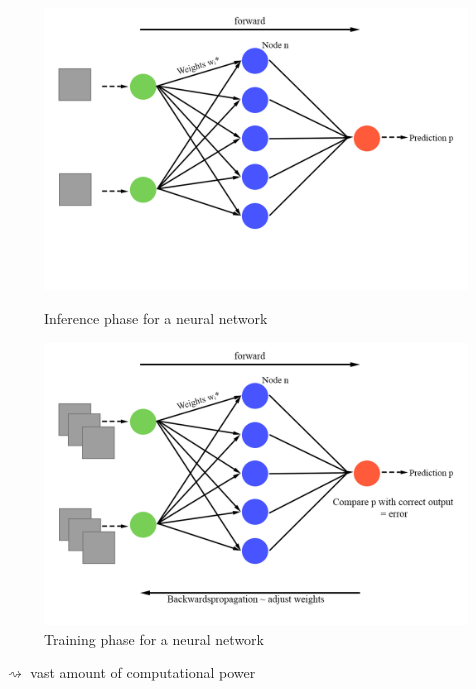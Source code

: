 \documentclass[en]{sdqbeamer}
\begin{document}
\begin{frame}
	\begin{figure}
		\centering
		\begin{minipage}{0.45\paperwidth}
			\centering
			\includegraphics[width=0.45\paperwidth]{pictures/inference.png}
			\caption{Inference phase for a neural network}
		\end{minipage}\vrule{}
		\begin{minipage}{0.45\paperwidth}
			\centering
			\includegraphics[width=0.45\paperwidth]{pictures/training.png}
			\caption{Training phase for a neural network}
		\end{minipage}
	\end{figure}
	$\rightsquigarrow$ vast amount of computational power
\end{frame}
\end{document}
